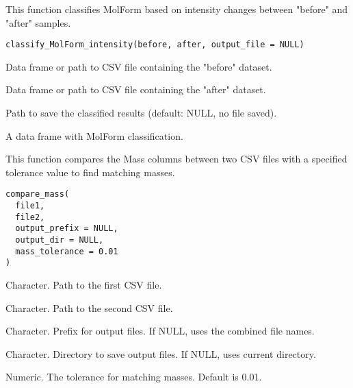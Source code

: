 \documentclass[a4paper]{book}
\begin{document}
%
\begin{Description}
This function classifies MolForm based on intensity changes between "before" and "after" samples.
\end{Description}
%
\begin{Usage}
\begin{verbatim}
classify_MolForm_intensity(before, after, output_file = NULL)
\end{verbatim}
\end{Usage}
%
\begin{Arguments}
\begin{ldescription}
\item[\code{before}] Data frame or path to CSV file containing the "before" dataset.

\item[\code{after}] Data frame or path to CSV file containing the "after" dataset.

\item[\code{output\_file}] Path to save the classified results (default: NULL, no file saved).
\end{ldescription}
\end{Arguments}
%
\begin{Value}
A data frame with MolForm classification.
\end{Value}
%
\begin{Description}
This function compares the Mass columns between two CSV files with a specified
tolerance value to find matching masses.
\end{Description}
%
\begin{Usage}
\begin{verbatim}
compare_mass(
  file1,
  file2,
  output_prefix = NULL,
  output_dir = NULL,
  mass_tolerance = 0.01
)
\end{verbatim}
\end{Usage}
%
\begin{Arguments}
\begin{ldescription}
\item[\code{file1}] Character. Path to the first CSV file.

\item[\code{file2}] Character. Path to the second CSV file.

\item[\code{output\_prefix}] Character. Prefix for output files. If NULL, uses the combined file names.

\item[\code{output\_dir}] Character. Directory to save output files. If NULL, uses current directory.

\item[\code{mass\_tolerance}] Numeric. The tolerance for matching masses. Default is 0.01.
\end{ldescription}
\end{Arguments}
\end{document}
